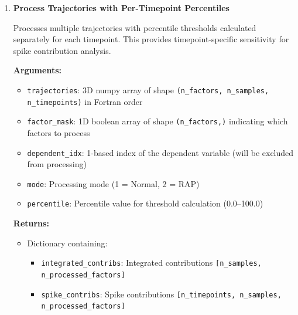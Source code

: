 \begin{enumerate}
          \begin{enumerate}
            \item \textbf{Process Trajectories with Per-Timepoint Percentiles}
                  
                  Processes multiple trajectories with percentile thresholds calculated separately
                  for each timepoint. This provides timepoint-specific sensitivity for
                  spike contribution analysis.
                  
                  \textbf{Arguments:}
                  \begin{itemize}
                    \item \texttt{trajectories}: 3D numpy array of shape \texttt{(n\_factors,
                          n\_samples, n\_timepoints)} in Fortran order
                    
                    \item \texttt{factor\_mask}: 1D boolean array of shape \texttt{(n\_factors,)}
                          indicating which factors to process
                          
                    \item \texttt{dependent\_idx}: 1-based index of the dependent variable
                          (will be excluded from processing)
                          
                    \item \texttt{mode}: Processing mode (1 = Normal, 2 = RAP)
                          
                    \item \texttt{percentile}: Percentile value for threshold calculation
                          (0.0--100.0)
                  \end{itemize}
                  \textbf{Returns:}
                  \begin{itemize}
                    \item Dictionary containing:
                          \begin{itemize}
                            \item \texttt{integrated\_contribs}: Integrated contributions \texttt{[n\_samples,
                                  n\_processed\_factors]}
                            
                            \item \texttt{spike\_contribs}: Spike contributions \texttt{[n\_timepoints,
                                  n\_samples, n\_processed\_factors]}
                            

\end{itemize}
\end{itemize}
\end{enumerate}
\end{enumerate}
